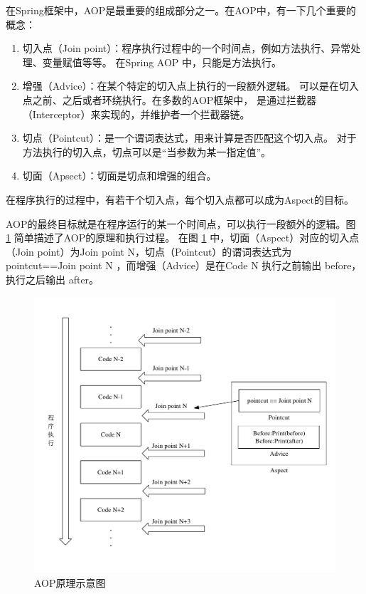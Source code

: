 在Spring框架中，AOP是最重要的组成部分之一。在AOP中，有一下几个重要的概念：
\begin{enumerate}
    \item 切入点（Join point）：程序执行过程中的一个时间点，例如方法执行、异常处理、变量赋值等等。
    在Spring AOP 中，只能是方法执行。
    \item 增强（Advice）：在某个特定的切入点上执行的一段额外逻辑。
    可以是在切入点之前、之后或者环绕执行。在多数的AOP框架中，
    是通过拦截器（Interceptor）来实现的，并维护者一个拦截器链。
    \item 切点（Pointcut）：是一个谓词表达式，用来计算是否匹配这个切入点。
    对于方法执行的切入点，切点可以是“当参数为某一指定值”。
    \item 切面（Apsect）：切面是切点和增强的组合。
\end{enumerate}

在程序执行的过程中，有若干个切入点，每个切入点都可以成为Aspect的目标。

AOP的最终目标就是在程序运行的某一个时间点，可以执行一段额外的逻辑。图 \ref{Fig:aop} 简单描述了AOP的原理和执行过程。
在图 \ref{Fig:aop} 中，切面（Aspect）对应的切入点（Join point）为Join point N，切点（Pointcut）的谓词表达式为 pointcut==Join point N
，而增强（Advice）是在Code N 执行之前输出 before，执行之后输出 after。

\begin{figure}[ht]
    \centering   
    \includegraphics[scale=.7]{./Figure/IMG_aop.pdf}
    \caption{AOP原理示意图}\label{Fig:aop}
\end{figure}

